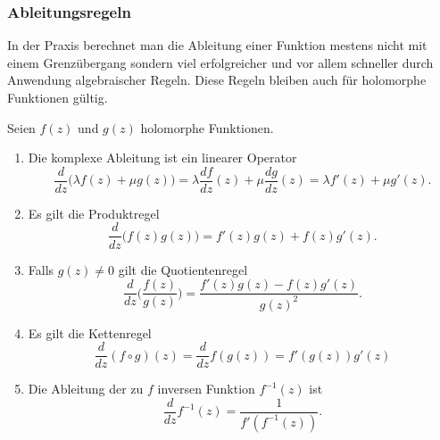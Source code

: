 %
%
\subsubsection{Ableitungsregeln}
In der Praxis berechnet man die Ableitung einer Funktion mestens nicht
mit einem Grenzübergang sondern viel erfolgreicher und vor allem schneller
durch Anwendung algebraischer Regeln.
Diese Regeln bleiben auch für holomorphe Funktionen gültig.
%

\begin{satz}[Rechenregeln]
\label{buch:holomorph:holomorph:satz:rechenregeln}
Seien $f(z)$ und $g(z)$ holomorphe Funktionen.
\begin{enumerate}
\item Die komplexe Ableitung ist ein linearer Operator
\[
\frac{d}{dz} \bigl(\lambda f(z) + \mu g(z)\bigr)
=
\lambda \frac{df}{dz}(z) + \mu\frac{dg}{dz}(z)
=
\lambda f'(z) + \mu g'(z).
\]
%
\item Es gilt die Produktregel
\[
\frac{d}{dz}\bigl(f(z)g(z))
=
f'(z)g(z) + f(z)g'(z).
\]
%
\item
Falls $g(z)\ne 0$ gilt die Quotientenregel
\[
\frac{d}{dz}\biggl(\frac{f(z)}{g(z)}\biggr)
=
\frac{f'(z)g(z)-f(z)g'(z)}{g(z)^2}.
\]
\item Es gilt die Kettenregel
\[
\frac{d}{dz}
(f\circ g)(z)
=
\frac{d}{dz}
f(g(z))
=
f'(g(z)) g'(z)
\]
%
\item Die Ableitung der zu $f$ inversen Funktion $f^{-1}(z)$ ist
\begin{equation}
\frac{d}{dz} f^{-1}(z)
=
\frac{1}{f'(f^{-1}(z))}.
\label{buch:holomoroph:holomorph:eqn:inverseholomorph}
\end{equation}
%
%
\end{enumerate}
\end{satz}

